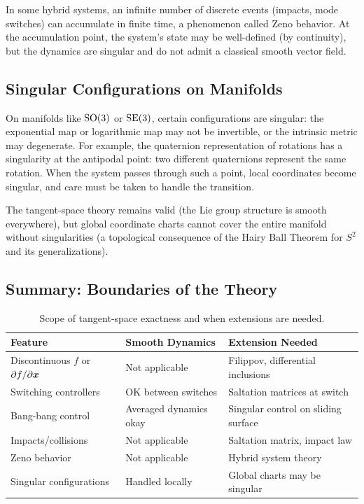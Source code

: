 In some hybrid systems, an infinite number of discrete events (impacts, mode switches) can
accumulate in finite time, a phenomenon called Zeno behavior. At the accumulation point, the
system's state may be well-defined (by continuity), but the dynamics are singular and do not
admit a classical smooth vector field.

\subsection{Singular Configurations on Manifolds}

On manifolds like $\mathrm{SO}(3)$ or $\mathrm{SE}(3)$, certain configurations are singular: the exponential
map or logarithmic map may not be invertible, or the intrinsic metric may degenerate. For example,
the quaternion representation of rotations has a singularity at the antipodal point: two different
quaternions represent the same rotation. When the system passes through such a point, local
coordinates become singular, and care must be taken to handle the transition.

The tangent-space theory remains valid (the Lie group structure is smooth everywhere), but
global coordinate charts cannot cover the entire manifold without singularities (a topological
consequence of the Hairy Ball Theorem for $S^2$ and its generalizations).

\subsection{Summary: Boundaries of the Theory}

\begin{table}[h]
\centering
\caption{Scope of tangent-space exactness and when extensions are needed.}
\label{tab:ch1:scope}
\begin{tabular}{@{}lll@{}}
\toprule
\textbf{Feature} & \textbf{Smooth Dynamics} & \textbf{Extension Needed} \\
\midrule
Discontinuous $f$ or $\partial f/\partial\bm{x}$ & Not applicable & Filippov, differential inclusions \\
Switching controllers & OK between switches & Saltation matrices at switch \\
Bang-bang control & Averaged dynamics okay & Singular control on sliding surface \\
Impacts/collisions & Not applicable & Saltation matrix, impact law \\
Zeno behavior & Not applicable & Hybrid system theory \\
Singular configurations & Handled locally & Global charts may be singular \\
\bottomrule
\end{tabular}
\end{table}

